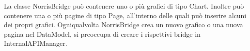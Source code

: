 La classe NorrisBridge può contenere uno o più grafici di tipo Chart. Inoltre può contenere una o più pagine di tipo Page, all'interno delle quali può inserire alcuni dei propri grafici. Ogniqualvolta NorrisBridge crea un nuovo grafico o una nuova pagina nel DataModel, si preoccupa di creare i rispettivi bridge in InternalAPIManager.

